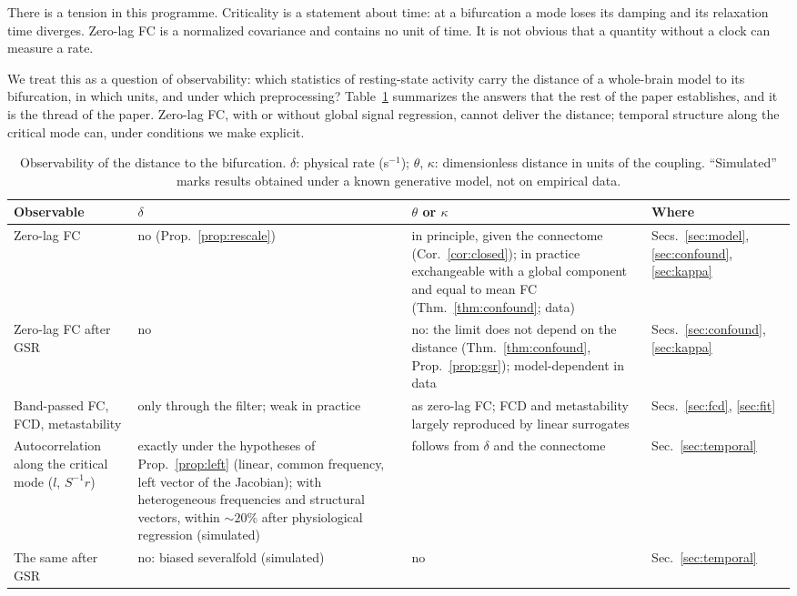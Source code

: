\documentclass[aip,cha,reprint,amsmath,amssymb]{revtex4-2}
\theoremstyle{remark}
\begin{document}
There is a tension in this programme. Criticality is a statement about time: at a bifurcation a mode loses its damping and its relaxation time diverges. Zero-lag FC is a normalized covariance and contains no unit of time. It is not obvious that a quantity without a clock can measure a rate.

We treat this as a question of observability: which statistics of resting-state activity carry the distance of a whole-brain model to its bifurcation, in which units, and under which preprocessing? Table~\ref{tab:observability} summarizes the answers that the rest of the paper establishes, and it is the thread of the paper. Zero-lag FC, with or without global signal regression, cannot deliver the distance; temporal structure along the critical mode can, under conditions we make explicit.

\begin{table}
\caption{Observability of the distance to the bifurcation. $\delta$: physical rate (s$^{-1}$); $\theta$, $\kappa$: dimensionless distance in units of the coupling. ``Simulated'' marks results obtained under a known generative model, not on empirical data.}
\label{tab:observability}
\begin{ruledtabular}
\begin{tabular}{p{}p{}p{}p{}}
Observable & $\delta$ & $\theta$ or $\kappa$ & Where \\
\hline
Zero-lag FC & no (Prop.~\ref{prop:rescale}) & in principle, given the connectome (Cor.~\ref{cor:closed}); in practice exchangeable with a global component and equal to mean FC (Thm.~\ref{thm:confound}; data) & Secs.~\ref{sec:model}, \ref{sec:confound}, \ref{sec:kappa} \\
Zero-lag FC after GSR & no & no: the limit does not depend on the distance (Thm.~\ref{thm:confound}, Prop.~\ref{prop:gsr}); model-dependent in data & Secs.~\ref{sec:confound}, \ref{sec:kappa} \\
Band-passed FC, FCD, metastability & only through the filter; weak in practice & as zero-lag FC; FCD and metastability largely reproduced by linear surrogates & Secs.~\ref{sec:fcd}, \ref{sec:fit} \\
Autocorrelation along the critical mode ($l$, $S^{-1}r$) & exactly under the hypotheses of Prop.~\ref{prop:left} (linear, common frequency, left vector of the Jacobian); with heterogeneous frequencies and structural vectors, within ${\sim}20\%$ after physiological regression (simulated) & follows from $\delta$ and the connectome & Sec.~\ref{sec:temporal} \\
The same after GSR & no: biased severalfold (simulated) & no & Sec.~\ref{sec:temporal} \\
\end{tabular}
\end{ruledtabular}
\end{table}
\end{document}
